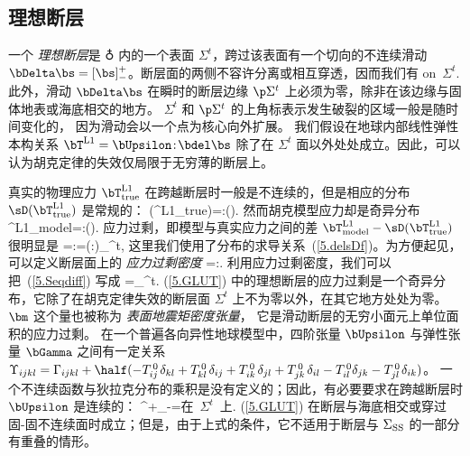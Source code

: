 \subsection{理想断层}
%
%
\label{5.sec.ideal}

一个 {\em 理想断层\/}是 $\earth$ 内的一个表面 $\Sigma^t$，跨过该表面有一个切向的不连续滑动 $\bDelta\bs=[\bs]^+_-$。断层面的两侧不容许分离或相互穿透，因而我们有
\eq
\bnuh\cdot\bDelta{}\quad\mbox{on $\Sigma^t$.}
\en
此外，滑动 $\bDelta\bs$ 在瞬时的断层边缘 $\p\Sigma^t$ 上必须为零，除非在该边缘与固体地表或海底相交的地方。
$\Sigma^t$ 和 $\p\Sigma^t$ 的上角标表示发生破裂的区域一般是随时间变化的，
因为滑动会以一个点为核心向外扩展。
我们假设在地球内部线性弹性本构关系
$\bT^{\rm L1}=\bUpsilon\!:\!\bdel\bs$ 除了在 $\Sigma^t$ 面以外处处成立。因此，可以认为胡克定律的失效仅局限于无穷薄的断层上。

真实的物理应力 $\bT^{\rm L1}_{\rm true}$
%
%
在跨越断层时一般是不连续的，但是相应的分布
$\sD(\bT^{\rm L1}_{\rm true})$ 是常规的：
\eq
\sD(\bT^{\rm L1}_{\rm true})=\bUpsilon\!:\!\sD(\bdel\bs).
\en
然而胡克模型应力却是奇异分布
%
%
%
%
\eq
\label{5.modstress}
\bT^{\rm L1}_{\rm model}=\bUpsilon\!:\!\bdel(\sD\bs).
\en
应力过剩，即模型与真实应力之间的差 $\bT^{\rm L1}_{\rm model}
-\sD(\bT^{\rm L1}_{\rm true})$ 很明显是
\eq \label{5.Seqdiff}
\bS=\bUpsilon\!:\![\bdel(\sD\bs)
-\sD(\bdel\bs)]=(\bUpsilon\!:\!\bnuh\bDelta\bs)\delta_{\Sigma^t},
\en
这里我们使用了分布的求导关系~(\ref{5.delsDf})。为方便起见，可以定义断层面上的 {\em 应力过剩密度\/}
%
\eq
\label{5.mdef}
\bm=\bUpsilon\!:\!\bnuh\bDelta\bs.
\en
利用应力过剩密度，我们可以把~(\ref{5.Seqdiff}) 写成
\eq
\label{5.GLUT}
\bS=\bm\hspace{0.2 mm}\delta_{\Sigma^t}.
\en
(\ref{5.GLUT}) 中的理想断层的应力过剩是一个奇异分布，它除了在胡克定律失效的断层面 $\Sigma^t$ 上不为零以外，在其它地方处处为零。
$\bm$ 这个量也被称为
{\em 表面地震矩密度张量\/}，
%
%
它是滑动断层的无穷小面元上单位面积的应力过剩。
在一个普遍各向异性地球模型中，四阶张量
$\bUpsilon$ 与弹性张量 $\bGamma$ 之间有一定关系 
$\Upsilon_{ijkl}=\Gamma_{ijkl}+\half(-T^{\,0}_{ij\,}\delta_{kl}
+T^{\,0}_{kl\,}\delta_{ij}+T^{\,0}_{ik\,}\delta_{jl}+T^{\,0}_{jk\,}\delta_{il}
-T^{\,0}_{il\,}\delta_{jk}-T^{\,0}_{jl\,}\delta_{ik})$。
一个不连续函数与狄拉克分布的乘积是没有定义的；因此，有必要要求在跨越断层时 $\bUpsilon$ 是连续的：
\eq
[\bUpsilon]^+_-=\bzero\quad\mbox{在 $\Sigma^t$ 上.}
\en
(\ref{5.GLUT}) 在断层与海底相交或穿过固-固不连续面时成立；但是，由于上式的条件，它不适用于断层与 $\Sigma_{\rm SS}$ 的一部分有重叠的情形。

